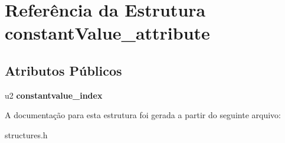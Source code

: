 \hypertarget{structconstantValue__attribute}{}\section{Referência da Estrutura constant\+Value\+\_\+attribute}
\label{structconstantValue__attribute}
\subsection*{Atributos Públicos}
\begin{DoxyCompactItemize}
\item 
\mbox{\label{structconstantValue__attribute_a08104752941d024731797a40dbd2d79d}} 
u2 {\bfseries constantvalue\+\_\+index}
\end{DoxyCompactItemize}


A documentação para esta estrutura foi gerada a partir do seguinte arquivo\+:\begin{DoxyCompactItemize}
\item 
structures.\+h\end{DoxyCompactItemize}
